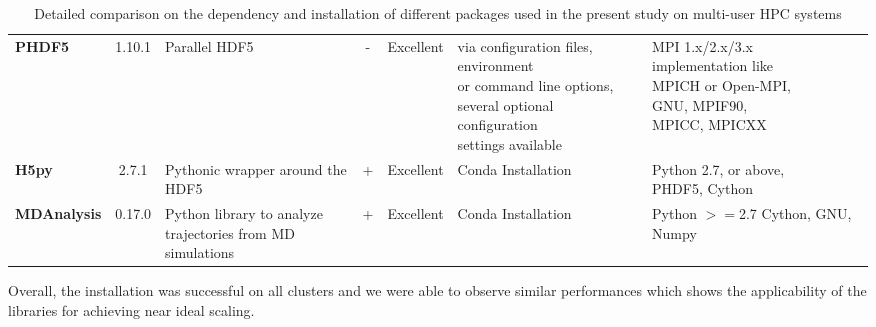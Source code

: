 \begin{table}[ht!]
\begin{adjustbox}{max width=\textwidth}
\begin{tabular}{l c l c c l l}
   \bfseries PHDF5 & 1.10.1 & Parallel HDF5 & - & Excellent & \makecell[l]{via configuration files, environment \\or command line options, \\ several optional configuration\\ settings available} &\makecell[l]{MPI 1.x/2.x/3.x  \\ implementation like \\ MPICH or Open-MPI,  \\GNU, MPIF90,  \\MPICC, MPICXX}\\
   \bfseries H5py &  2.7.1 & Pythonic wrapper around the HDF5 & + & Excellent & Conda Installation & \makecell[l]{Python 2.7, or above,\\ PHDF5, Cython}\\    
   \bfseries MDAnalysis & 0.17.0 & \makecell[l]{Python library to analyze  \\trajectories from MD simulations} & + & Excellent & Conda Installation & \makecell[l]{Python $>=$2.7 \\ Cython, GNU, Numpy}\\
  \bottomrule
\end{tabular}
\end{adjustbox}
\caption[Version of the packages used in the present study]
{Detailed comparison on the dependency and installation of different packages used in the present study on multi-user HPC systems}
\label{tab:version}
\end{table}

Overall, the installation was successful on all clusters and we were able to observe similar performances which shows the applicability of the libraries for achieving near ideal scaling.

